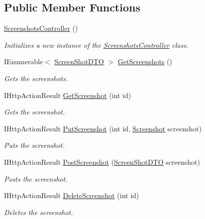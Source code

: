 \subsection*{Public Member Functions}
\begin{DoxyCompactItemize}
\item 
\hyperlink{class_open_1_1_g_i_1_1hypermart_1_1_controllers_1_1_a_p_i_1_1_screenshots_controller_a38315fc7ad90feab2c072d48de02b602}{Screenshots\+Controller} ()
\begin{DoxyCompactList}\small\item\em Initializes a new instance of the \hyperlink{class_open_1_1_g_i_1_1hypermart_1_1_controllers_1_1_a_p_i_1_1_screenshots_controller}{Screenshots\+Controller} class. \end{DoxyCompactList}\item 
I\+Enumerable$<$ \hyperlink{class_open_1_1_g_i_1_1hypermart_1_1_docs_1_1_data_transformation_objects_1_1_screen_shot_d_t_o}{Screen\+Shot\+D\+TO} $>$ \hyperlink{class_open_1_1_g_i_1_1hypermart_1_1_controllers_1_1_a_p_i_1_1_screenshots_controller_a59d05cd470e6721699f0234f99c9a213}{Get\+Screenshots} ()
\begin{DoxyCompactList}\small\item\em Gets the screenshots. \end{DoxyCompactList}\item 
I\+Http\+Action\+Result \hyperlink{class_open_1_1_g_i_1_1hypermart_1_1_controllers_1_1_a_p_i_1_1_screenshots_controller_abfe715c661c5a7a53ac5a382ff24b354}{Get\+Screenshot} (int id)
\begin{DoxyCompactList}\small\item\em Gets the screenshot. \end{DoxyCompactList}\item 
I\+Http\+Action\+Result \hyperlink{class_open_1_1_g_i_1_1hypermart_1_1_controllers_1_1_a_p_i_1_1_screenshots_controller_a5b53a659a1cf98b2e2866bc9415f69bd}{Put\+Screenshot} (int id, \hyperlink{class_open_1_1_g_i_1_1hypermart_1_1_models_1_1_screenshot}{Screenshot} screenshot)
\begin{DoxyCompactList}\small\item\em Puts the screenshot. \end{DoxyCompactList}\item 
I\+Http\+Action\+Result \hyperlink{class_open_1_1_g_i_1_1hypermart_1_1_controllers_1_1_a_p_i_1_1_screenshots_controller_a31b7e3814b2ea1fde97b28a76b6315db}{Post\+Screenshot} (\hyperlink{class_open_1_1_g_i_1_1hypermart_1_1_docs_1_1_data_transformation_objects_1_1_screen_shot_d_t_o}{Screen\+Shot\+D\+TO} screenshot)
\begin{DoxyCompactList}\small\item\em Posts the screenshot. \end{DoxyCompactList}\item 
I\+Http\+Action\+Result \hyperlink{class_open_1_1_g_i_1_1hypermart_1_1_controllers_1_1_a_p_i_1_1_screenshots_controller_a85094c9aa969d9d3fc2a746847eef6e8}{Delete\+Screenshot} (int id)
\begin{DoxyCompactList}\small\item\em Deletes the screenshot. \end{DoxyCompactList}\end{DoxyCompactItemize}
